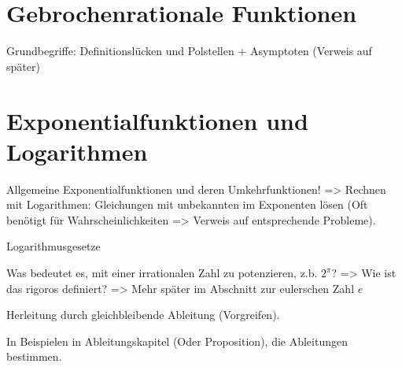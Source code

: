 \begin{theorem}[pq-Formel]
    
\end{theorem}

\begin{theorem}
    
\end{theorem}

\begin{theorem}[Polynomdivision]
    
\end{theorem}


\section{Gebrochenrationale Funktionen}

\begin{definition}
    
\end{definition}

Grundbegriffe: Definitionslücken und Polstellen + Asymptoten (Verweis auf später)

\begin{definition}
    
\end{definition}

\begin{definition}[Polstelle]
    
\end{definition}

\section{Exponentialfunktionen und Logarithmen}
Allgemeine Exponentialfunktionen und deren Umkehrfunktionen!
=> Rechnen mit Logarithmen: Gleichungen mit unbekannten im Exponenten lösen (Oft benötigt für Wahrscheinlichkeiten => Verweis auf entsprechende Probleme). 

Logarithmusgesetze

Was bedeutet es, mit einer irrationalen Zahl zu potenzieren, z.b. \(2^\pi\)? => Wie ist das rigoros definiert? => Mehr später im Abschnitt zur eulerschen Zahl \(e\)

Herleitung durch gleichbleibende Ableitung (Vorgreifen). 

In Beispielen in Ableitungskapitel (Oder Proposition), die Ableitungen bestimmen. 

